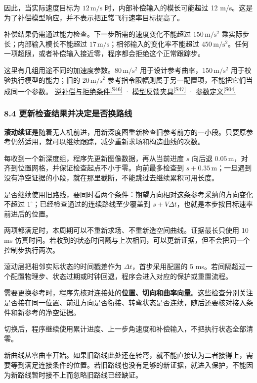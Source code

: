 \documentclass[12pt,a4paper]{article}
\numberwithin{equation}{topic}
\newcommand{\sourceref}[2]{\hyperlink{source-#1}{#2\textsuperscript{[#1]}}}
\begin{document}
因此，当实际速度目标为 \(12\,\mathrm{m/s}\) 时，内部补偿输入的模长可能超过 12 m/s。这是为了补偿模型响应，并不表示把正常飞行速率目标提高了。

补偿结果仍需通过能力检查。下一步所需的速度变化不能超过 \(150\,\mathrm{m/s^2}\) 乘实际步长；内部输入模长不能超过 \(17\,\mathrm{m/s}\)；相邻输入的变化率不能超过 \(450\,\mathrm{m/s^2}\)。任何一项超限，或者补偿输入接近零，程序都会拒绝这个正常跟踪步。

这里有几组用途不同的加速度参数。\(80\,\mathrm{m/s^2}\) 用于设计参考曲率，\(150\,\mathrm{m/s^2}\) 用于校验执行模型的能力；旧的 \(20\,\mathrm{m/s^2}\) 参考指令限幅则属于另一配置项，不能把它们当成同一个参数。 \sourceref{S46}{逆补偿与拒绝条件} · \sourceref{S47}{模型反馈夹具} · \sourceref{S04}{参数定义}

\subsubsection*{8.4 更新检查结果并决定是否换路线}

\textbf{滚动续证}是随着无人机前进，用新深度图重新检查旧参考前方的一小段。只要原参考仍然适用，就可以继续跟踪，减少重新求场和构造曲线的次数。

每收到一个新深度组，程序先更新图像数据，再从当前进度 \(s\) 向后退 \(0.05\,\mathrm m\)，对齐到位置网格，并保证检查起点不小于零。向前最多检查到 \(s+0.35\,\mathrm m\)；一旦遇到没有净空证据的小段，就在那里截断，不能跳过去继续累积可用长度。

是否继续使用旧路线，要同时看两个条件：期望方向相对这条参考采纳的方向变化不超过 \(1^\circ\)；已经检查通过的连续路线至少覆盖到 \(s+V\Delta t\)，也就是本步按目标速率前进后的位置。

两项都满足时，本周期可以不重新求场、不重新造空间曲线。证据最长只使用 10 ms 仿真时间。若收到的状态时间戳与上次相同，可以更新证据，但不会把同一个控制步执行两次。

滚动层把相邻实际状态的时间戳差作为 \(\Delta t\)，首步采用配置的 5 ms。若间隔超过一个配置物理步、状态过期或时钟回退，程序会进入对应的保护或重置流程。

需要更换参考时，程序先核对连接处的\textbf{位置、切向和曲率向量}。这些检查分别关注是否接在同一位置、前进方向是否衔接、转弯状态是否连续，随后还要核对接入条件和新参考的净空证据。

切换后，程序继续使用累计进度、上一步角速度和补偿输入，不把执行状态全部清零。

新曲线从零曲率开始。如果旧路线此处还在转弯，就不能直接认为二者接得上，需要等到满足连接条件的位置。若旧路线也没有足够的新证据，就进入保护，不能因为新路线暂时接不上而忽略旧路线已经缺证。
\end{document}
